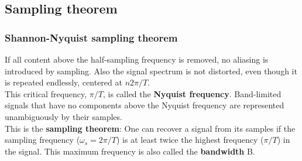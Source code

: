 \subsection{Sampling theorem}

\begin{frame}
	\frametitle{Shannon-Nyquist sampling theorem}
	\begin{block}{}
	If all content above the half-sampling frequency is removed, no aliasing is introduced by sampling. Also the signal spectrum is not distorted, even though it is repeated endlessly, centered at $n2\pi/T$.\\
	\medskip
	This critical frequency, $\pi/T$, is called the \textbf{Nyquist frequency}. Band-limited signals that have no components above the Nyquist frequency are represented unambiguously by their samples. \\
	\medskip
	This is the \textbf{sampling theorem}: One can recover a signal from its samples if the sampling frequency ($\omega_s=2\pi/T$) is at least twice the highest frequency ($\pi/T$) in the signal. This maximum frequency is also called the \textbf{bandwidth} B.
	\end{block}
\end{frame}

